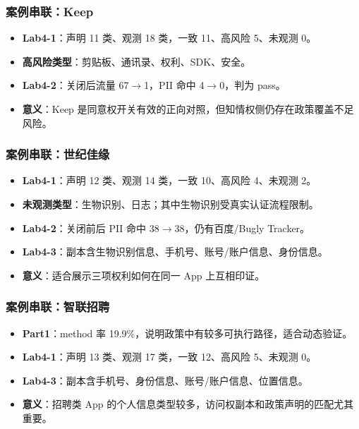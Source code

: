 \documentclass[AutoFakeBold,AutoFakeSlant]{beamer}
\begin{document}
\begin{frame}
    \frametitle{案例串联：Keep}
    \small
    \begin{itemize}
        \item \textbf{Lab4-1}：声明 11 类、观测 18 类，一致 11、高风险 5、未观测 0。
        \item \textbf{高风险类型}：剪贴板、通讯录、权利、SDK、安全。
        \item \textbf{Lab4-2}：关闭后流量 67$\rightarrow$1，PII 命中 4$\rightarrow$0，判为 pass。
        \item \textbf{意义}：Keep 是同意权开关有效的正向对照，但知情权侧仍存在政策覆盖不足风险。
    \end{itemize}
\end{frame}

\begin{frame}
    \frametitle{案例串联：世纪佳缘}
    \small
    \begin{itemize}
        \item \textbf{Lab4-1}：声明 12 类、观测 14 类，一致 10、高风险 4、未观测 2。
        \item \textbf{未观测类型}：生物识别、日志；其中生物识别受真实认证流程限制。
        \item \textbf{Lab4-2}：关闭前后 PII 命中 38$\rightarrow$38，仍有百度/Bugly Tracker。
        \item \textbf{Lab4-3}：副本含生物识别信息、手机号、账号/账户信息、身份信息。
        \item \textbf{意义}：适合展示三项权利如何在同一 App 上互相印证。
    \end{itemize}
\end{frame}

\begin{frame}
    \frametitle{案例串联：智联招聘}
    \small
    \begin{itemize}
        \item \textbf{Part1}：method 率 19.9\%，说明政策中有较多可执行路径，适合动态验证。
        \item \textbf{Lab4-1}：声明 13 类、观测 17 类，一致 12、高风险 5、未观测 0。
        \item \textbf{Lab4-3}：副本含手机号、身份信息、账号/账户信息、位置信息。
        \item \textbf{意义}：招聘类 App 的个人信息类型较多，访问权副本和政策声明的匹配尤其重要。
    \end{itemize}
\end{frame}
\end{document}
